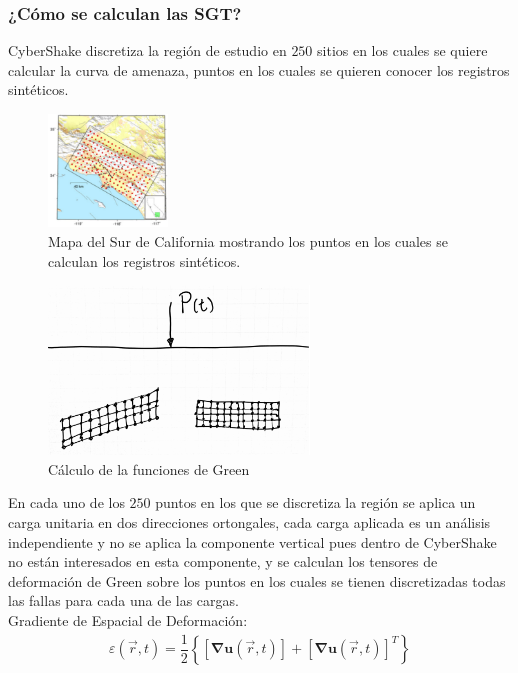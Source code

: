 %
%
\begin{frame}[allowframebreaks]
\frametitle{¿Cómo se calculan las SGT?}
%
\justifying
%
CyberShake discretiza la región de estudio en $250$ sitios en los cuales se quiere calcular la curva de amenaza, puntos en los cuales se quieren conocer los registros sintéticos.
%
\begin{figure}[h]
	\centering
	\includegraphics[height=3cm]{img/Discretizacion.pdf}
	\caption{Mapa del Sur de California mostrando los puntos en los cuales se calculan los registros sintéticos. \cite[figura 1, página 3]{gravesetal}}
	\vspace{-.5 cm}
\end{figure}
%
%
\begin{figure}[h]
	\centering
	\includegraphics[height=4.5cm]{img/SGT.pdf}
	\caption{Cálculo de la funciones de Green}
	\vspace{-.5 cm}
\end{figure}
%
%
En cada uno de los $250$ puntos en los que se discretiza la región se aplica un carga unitaria en dos direcciones ortongales, cada carga aplicada es un análisis independiente y no se aplica la componente vertical pues dentro de CyberShake no están interesados en esta componente, y se calculan los tensores de deformación de Green sobre los puntos en los cuales se tienen discretizadas todas las fallas para cada una de las cargas.\\
%
Gradiente de Espacial de Deformación:
%
\begin{align*}
	\varepsilon \left( \vec{r}, t \right) = \dfrac{1}{2} \left\lbrace \left[ \mathbf{\nabla u } \left( \vec{r}, t \right) \right] + \left[ \mathbf{\nabla u} \left( \vec{r}, t \right) \right]^T \right\rbrace

\end{align*}
\end{frame}
